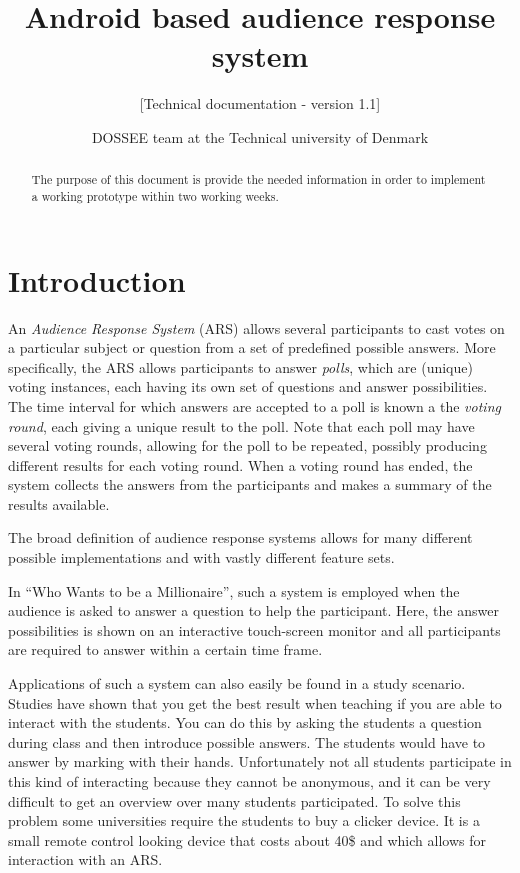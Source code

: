 \documentclass{acm_proc_article-sp}
\begin{document}
\thispagestyle{fancy}%
\title{Android based audience response system}
\subtitle{[Technical documentation - version 1.1]
}

\author{
\alignauthor DOSSEE team at the Technical university of Denmark
}


\maketitle

\begin{abstract}
The purpose of this document is provide the needed information in order to implement a working prototype within two working weeks.
\end{abstract}
\section{Introduction}
\label{sec:introduction}
An \textit{Audience Response System} (ARS) allows several participants to cast votes on a particular subject or question from a set of predefined possible answers. More specifically, the ARS allows participants to answer \textit{polls}, which are (unique) voting instances, each having its own set of questions and answer possibilities. The time interval for which answers are accepted to a poll is known a the \textit{voting round}, each giving a unique result to the poll. Note that each poll may have several voting rounds, allowing for the poll to be repeated, possibly producing different results for each voting round. When a voting round has ended, the system collects the answers from the participants and makes a summary of the results available. 

The broad definition of audience response systems allows for many different possible implementations and with vastly different feature sets.

In “Who Wants to be a Millionaire”, such a system is employed when the audience is asked to answer a question to help the participant. Here, the answer possibilities is shown on an interactive touch-screen monitor and all participants are required to answer within a certain time frame.

Applications of such a system can also easily be found in a study scenario. Studies have shown that you get the best result when teaching if you are able to interact with the students. You can do this by asking the students a question during class and then introduce possible answers. The students would have to answer by marking with their hands.  Unfortunately not all students participate in this kind of interacting because they cannot be anonymous, and it can be very difficult to get an overview over many students participated. To solve this problem some universities require the students to buy a clicker device. It is a small remote control looking device that costs about 40\$ and which allows for interaction with an ARS. 
\end{document}
